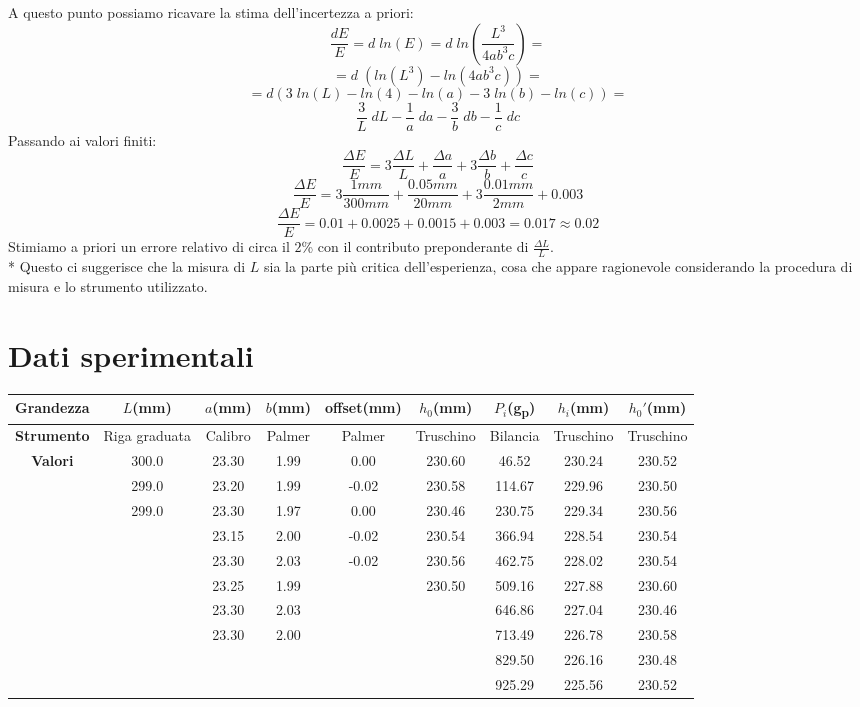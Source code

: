 \documentclass[10pt,a4paper]{book}
\begin{document}
A questo punto possiamo ricavare la stima dell'incertezza a priori:
$$
\frac{dE}{E} = d\;ln(E) = d\;ln\left(\frac{L^3}{4ab^3c}\right) =
$$
$$
= d\;(ln(L^3) - ln(4ab^3c)) =
$$
$$
= d(3\;ln(L) - ln(4) - ln(a) - 3\;ln(b) - ln(c)) =
$$
$$
\frac{3}{L}\;dL - \frac{1}{a}\;da - \frac{3}{b}\;db - \frac{1}{c}\;dc
$$
Passando ai valori finiti:
$$
\frac{\Delta E}{E} = 3\frac{\Delta L}{L} + \frac{\Delta a}{a} + 3 \frac{\Delta b}{b} + \frac{\Delta c}{c}
$$
$$
\frac{\Delta E}{E} = 3\frac{1mm}{300mm} + \frac{0.05mm}{20mm} + 3 \frac{0.01mm}{2mm} + 0.003
$$
$$
\frac{\Delta E}{E} = 0.01 + 0.0025 + 0.0015 + 0.003 = 0.017 \approx 0.02
$$
Stimiamo a priori un errore relativo di circa il $2$\% con il contributo preponderante di $\frac{\Delta L}{L}$.\\*
Questo ci suggerisce che la misura di $L$ sia la parte più critica dell'esperienza, cosa che appare ragionevole considerando la procedura di misura e lo strumento utilizzato.
\section*{Dati sperimentali}
\small
\begin{tabular}{|c|c|c|c|c|c|c|c|c|}
	\hline 
	\textbf{Grandezza} & $L$(mm) & $a$(mm) & $b$(mm) & offset(mm) & $h_0$(mm) & $P_i$(g\textsubscript{p})& $h_i$(mm) & $h_0'$(mm) \\ 
	\hline 
	\textbf{Strumento} & Riga graduata & Calibro & Palmer & Palmer & Truschino & Bilancia & Truschino & Truschino \\ 
	\hline 
	\textbf{Valori}
	& 300.0  & 23.30 & 1.99 & 0.00 & 230.60 & 46.52  & 230.24 & 230.52 \\ 
	\hline 
	& 299.0  & 23.20 & 1.99 & -0.02 & 230.58 & 114.67 & 229.96 & 230.50 \\ 
	\hline 
	& 299.0  & 23.30 & 1.97 & 0.00 & 230.46 & 230.75 & 229.34 & 230.56 \\ 
	\hline 
	&  & 23.15 & 2.00 & -0.02 & 230.54 & 366.94 & 228.54 & 230.54 \\ 
	\hline 
	&  & 23.30 & 2.03 & -0.02 & 230.56 & 462.75 & 228.02 & 230.54 \\ 
	\hline 
	&  & 23.25 & 1.99 &  & 230.50 & 509.16 & 227.88 & 230.60 \\ 
	\hline 
	&  & 23.30 & 2.03 &  &  & 646.86 & 227.04 & 230.46 \\ 
	\hline 
	&  & 23.30 & 2.00 &  &  & 713.49 & 226.78 & 230.58 \\ 
	\hline 
	&  &  &  &  &  & 829.50 & 226.16 & 230.48 \\ 
	\hline 
	&  &  &  &  &  & 925.29 & 225.56 & 230.52 \\ 
	\hline 
\end{tabular}
\normalsize
\end{document}
